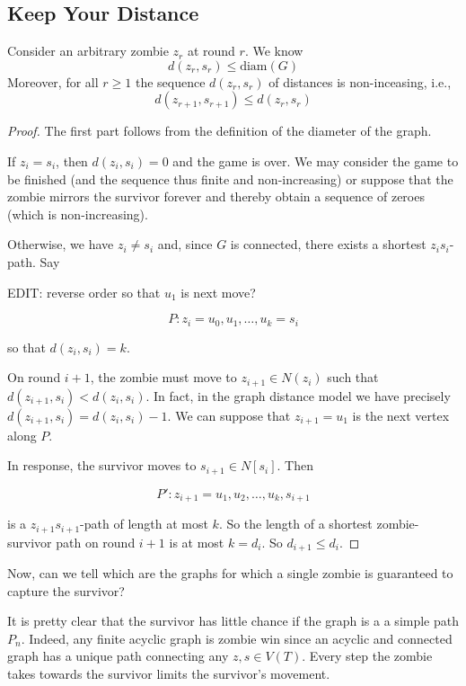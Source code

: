 \subsection{Keep Your Distance}

  Consider an arbitrary zombie $z_r$ at round $r$.
  We know
  \[d(z_r, s_r) \leq \text{diam}(G) \]
  Moreover, for all $r \geq 1$ the sequence $d(z_r, s_r)$ of distances is non-inceasing, i.e.,
  \[ d(z_{r+1}, s_{r+1}) \leq d(z_r, s_r)\]

\begin{proof}
The first part follows from the definition of the diameter of the graph.

If $z_i = s_i$, then $d(z_i, s_i) = 0$ and the game is over. We may consider the
game to be finished (and the sequence thus finite and non-increasing)
or suppose that the zombie mirrors the survivor forever and thereby obtain a sequence
of zeroes (which is non-increasing).

Otherwise, we have $z_i \not= s_i$ and, since $G$ is connected, there exists a shortest $z_is_i$-path. Say

EDIT: reverse order so that $u_1$ is next move?

\[ P : z_i = u_0, u_1, \dots, u_k = s_i \]

so that $d(z_i, s_i) = k$.

On round $i+1$, the zombie must move to $z_{i+1} \in N(z_i)$ such that $d(z_{i+1}, s_i) < d(z_i, s_i)$.
In fact, in the graph distance model we have precisely $d(z_{i+1}, s_i) = d(z_i, s_i) - 1$.
We can suppose that $z_{i+1} = u_1$ is the next vertex along $P$.

In response, the survivor moves to $s_{i+1} \in N[s_i]$. Then

\[ P' : z_{i+1} = u_1, u_2, \dots, u_k, s_{i+1} \]

is a $z_{i+1}s_{i+1}$-path of length at most $k$. So the length of a shortest zombie-survivor
path on round $i+1$ is at most $k = d_i$. So $d_{i+1} \leq d_i$.
\end{proof}

Now, can we tell which are the graphs for which a single zombie is guaranteed to capture the
survivor?

It is pretty clear that the survivor has little chance if the graph is a
a simple path $P_n$.
Indeed, any finite acyclic graph is zombie win since an acyclic and connected graph
has a unique path connecting any $z, s \in V(T)$. Every step the zombie takes towards
the survivor limits the survivor's movement.
